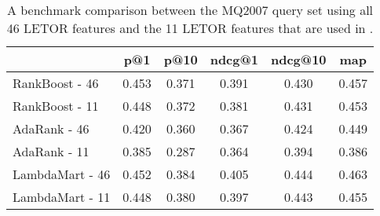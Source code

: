 \begin{table}[h]
\caption{A benchmark comparison between the MQ2007 query set using all 46 LETOR features and the 11 LETOR features that are used in \datasetname.}
\label{tab:11vs46}
\centering
\begin{tabular}{lccccc}
\toprule
           & p@1  & p@10   & ndcg@1 & ndcg@10 & map \\ 
\midrule
RankBoost - 46 & 0.453 & 0.371 & 0.391 & 0.430  & 0.457 \\
RankBoost - 11 & 0.448 & 0.372 & 0.381  & 0.431   & 0.453 \\
\midrule
AdaRank - 46  & 0.420 & 0.360 & 0.367 & 0.424  & 0.449 \\
AdaRank - 11  & 0.385 & 0.287 & 0.364  & 0.394   & 0.386 \\ 
\midrule
LambdaMart - 46 & 0.452 & 0.384 & 0.405 & 0.444  & 0.463 \\
LambdaMart - 11 & 0.448 & 0.380 & 0.397  & 0.443   & 0.455 \\
\bottomrule
\end{tabular}
\end{table}